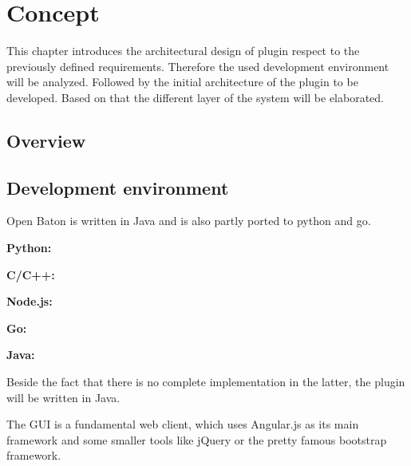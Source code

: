 \acresetall

\chapter{Concept}\label{chapter:concept}
This chapter introduces the architectural design of plugin respect to the previously defined requirements.
Therefore the used development environment will be analyzed.
Followed by the initial architecture of the plugin to be developed.
Based on that the different layer of the system will be elaborated.

\section{Overview}
\doit


\section{Development environment}
\doit

Open Baton is written in Java and is also partly ported to python and go.

\textbf{Python:}

\textbf{C/C++:}

\textbf{Node.js:}

\textbf{Go:}

\textbf{Java:}

Beside the fact that there is no complete implementation in the latter, the plugin will be written in Java.

The \ac{GUI} is a fundamental web client, which uses Angular.js as its main framework and some smaller tools like jQuery or the pretty famous bootstrap framework.


